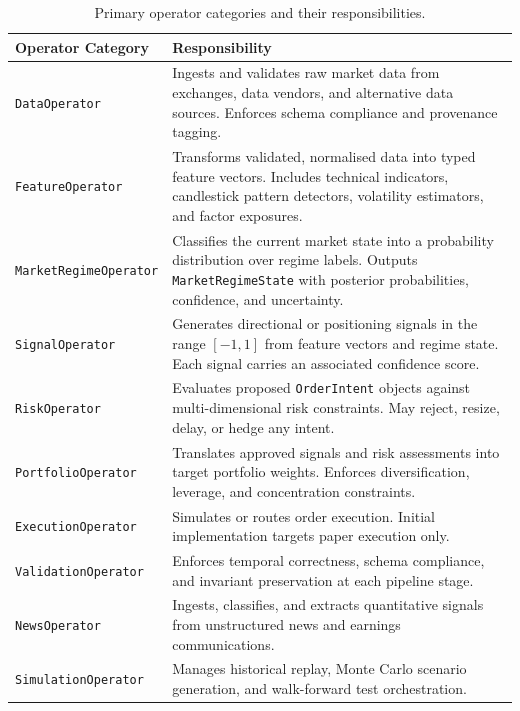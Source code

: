 \documentclass[12pt,openany]{book}
\numberwithin{equation}{chapter}
\theoremstyle{plain}
\theoremstyle{definition}
\theoremstyle{remark}
\begin{document}
\begin{table}[H]
\centering
\caption{Primary operator categories and their responsibilities.}
\label{tab:operator_taxonomy}
\small
\begin{tabularx}{\textwidth}{p{4.25cm} p{10.5cm}}
\toprule
\textbf{Operator Category} & \textbf{Responsibility} \\
\midrule
\texttt{DataOperator} &
    Ingests and validates raw market data from exchanges, data vendors,
    and alternative data sources. Enforces schema compliance and
    provenance tagging. \\
\midrule
\texttt{FeatureOperator} &
    Transforms validated, normalised data into typed feature vectors.
    Includes technical indicators, candlestick pattern detectors,
    volatility estimators, and factor exposures. \\
\midrule
\texttt{MarketRegimeOperator} &
    Classifies the current market state into a probability distribution
    over regime labels. Outputs \texttt{MarketRegimeState} with
    posterior probabilities, confidence, and uncertainty. \\
\midrule
\texttt{SignalOperator} &
    Generates directional or positioning signals in the range $[-1, 1]$
    from feature vectors and regime state. Each signal carries an
    associated confidence score. \\
\midrule
\texttt{RiskOperator} &
    Evaluates proposed \texttt{OrderIntent} objects against multi-dimensional
    risk constraints. May reject, resize, delay, or hedge any intent. \\
\midrule
\texttt{PortfolioOperator} &
    Translates approved signals and risk assessments into target portfolio
    weights. Enforces diversification, leverage, and concentration constraints. \\
\midrule
\texttt{ExecutionOperator} &
    Simulates or routes order execution. Initial implementation targets
    paper execution only. \\
\midrule
\texttt{ValidationOperator} &
    Enforces temporal correctness, schema compliance, and invariant
    preservation at each pipeline stage. \\
\midrule
\texttt{NewsOperator} &
    Ingests, classifies, and extracts quantitative signals from
    unstructured news and earnings communications. \\
\midrule
\texttt{SimulationOperator} &
    Manages historical replay, Monte Carlo scenario generation,
    and walk-forward test orchestration. \\
\bottomrule
\end{tabularx}
\end{table}
\end{document}
